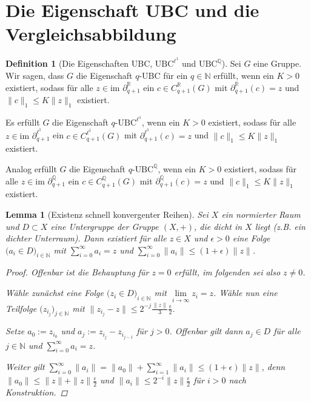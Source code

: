 \documentclass[a4paper,twoside,10pt]{scrreprt}
\newcommand{\N}{\mathbb{N}}
\newcommand{\Q}{\mathbb{Q}}
\newcommand{\R}{\mathbb{R}}
\newtheorem{lemma}[satz]{Lemma}
\theoremstyle{definition}
\newtheorem{definition}[satz]{Definition}
\begin{document}
\section{Die Eigenschaft UBC und die Vergleichsabbildung}\label{sec:UBCandComparisonMap}
\begin{definition}[Die Eigenschaften UBC, $\text{UBC}^{\ell^1}$ und $\text{UBC}^{\Q}$]\label{def:DefUBCProperty}
Sei $G$ eine Gruppe. Wir sagen, dass $G$ die Eigenschaft $q$-UBC für ein $q\in \N$ erfüllt, wenn ein $K>0$ existiert, sodass für alle $z\in \text{im~} \partial_{q+1}^{\R}$ ein $c\in C_{q+1}^{\R}(G)$ mit $\partial_{q+1}^{\R}(c)=z$ und $\|c\|_1\leq K\|z\|_1$ existiert.\par
Es erfüllt $G$ die Eigenschaft $q$-$\text{UBC}^{\ell^1}$, wenn ein $K>0$ existiert, sodass für alle $z\in \text{im~} \partial_{q+1}^{\ell^1}$ ein $c\in C_{q+1}^{\ell^1}(G)$ mit $\partial_{q+1}^{\ell^1}(c)=z$ und $\|c\|_1\leq K\|z\|_1$ existiert.\par
Analog erfüllt $G$ die Eigenschaft $q$-$\text{UBC}^{\Q}$, wenn ein $K>0$ existiert, sodass für alle $z\in \text{im~} \partial_{q+1}^{\Q}$ ein $c\in C_{q+1}^{\Q}(G)$ mit $\partial_{q+1}^{\Q}(c)=z$ und $\|c\|_1\leq K\|z\|_1$ existiert.
\end{definition}

\begin{lemma}[Existenz schnell konvergenter Reihen]\label{lem:FastConvergingSeries}
Sei $X$ ein normierter Raum und $D\subset X$ eine Untergruppe der Gruppe $(X,+)$, die dicht in $X$ liegt (z.B. ein dichter Unterraum). Dann existiert für alle $z\in X$ und $\epsilon>0$ eine Folge $\bigl(a_i\in D\bigr)_{i\in\N}$ mit $\sum\limits_{i=0}^{\infty}a_i=z$ und $\sum\limits_{i=0}^{\infty}\|a_i\|\leq(1+\epsilon)\|z\|$.
\begin{proof}
Offenbar ist die Behauptung für $z=0$ erfüllt, im folgenden sei also $z\neq 0$.\par
Wähle zunächst eine Folge $\bigl(z_i\in D\bigr)_{i\in\N}$ mit $\lim\limits_{i\to\infty}z_i=z$. Wähle nun eine Teilfolge $\bigl(z_{i_j}\bigr)_{j\in\N}$ mit $\|z_{i_j}-z\|\leq 2^{-j}\frac{\|z\|}{3}\frac{\epsilon}{2}$.\par
Setze $a_0:=z_{i_0}$ und $a_j:=z_{i_j}-z_{i_{j-1}}$ für $j>0$. Offenbar gilt dann $a_j\in D$ für alle $j\in \N$ und $\sum\limits_{i=0}^{\infty}a_i=z$.\par
Weiter gilt $\sum\limits_{i=0}^{\infty}\|a_i\|=\|a_0\|+\sum\limits_{i=1}^{\infty}\|a_i\|\leq (1+\epsilon)\|z\|$, denn $\|a_0\|\leq \|z\|+\|z\|\frac{\epsilon}{2}$ und $\|a_i\|\leq 2^{-i}\|z\|\frac{\epsilon}{2}$ für $i>0$ nach Konstruktion.
\end{proof}
\end{lemma}
\end{document}
